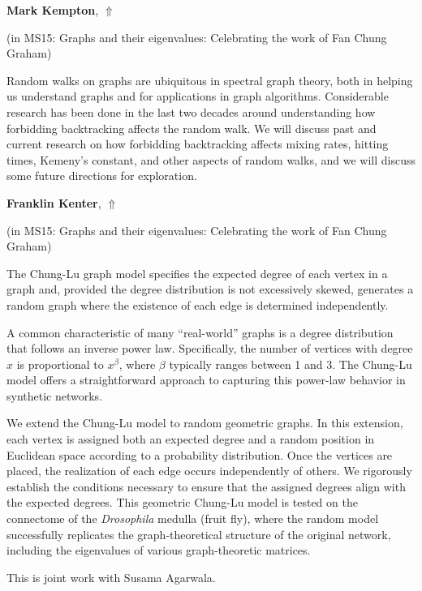 \documentclass[ILAS2025-program.tex]{subfiles}
\begin{document}
\hypertarget{down0140}{}\begin{ilasabstract}
    
\textbf{Mark Kempton},  \hfill \hyperlink{up0140}{$\Uparrow$}
    
    
(in {\color{mstitle}MS15: Graphs and their eigenvalues: Celebrating the work of Fan Chung Graham})
        
\mtskip
    Random walks on graphs are ubiquitous in spectral graph theory, both in helping us understand graphs and for applications in graph algorithms.  Considerable research has been done in the last two decades around understanding how forbidding backtracking affects the random walk.  We will discuss past and current research on how forbidding backtracking affects mixing rates, hitting times, Kemeny's constant, and other aspects of random walks, and we will discuss some future directions for exploration.

\end{ilasabstract}
    

\hypertarget{down0138}{}\begin{ilasabstract}
    
\textbf{Franklin Kenter},  \hfill \hyperlink{up0138}{$\Uparrow$}
    
    
(in {\color{mstitle}MS15: Graphs and their eigenvalues: Celebrating the work of Fan Chung Graham})
        
\mtskip
    The Chung-Lu graph model specifies the expected degree of each vertex in a graph and, provided the degree distribution is not excessively skewed, generates a random graph where the existence of each edge is determined independently.

A common characteristic of many ``real-world'' graphs is a degree distribution that follows an inverse power law. Specifically, the number of vertices with degree $x$ is proportional to $x^\beta$, where $\beta$ typically ranges between 1 and 3. The Chung-Lu model offers a straightforward approach to capturing this power-law behavior in synthetic networks.

We extend the Chung-Lu model to random geometric graphs. In this extension, each vertex is assigned both an expected degree and a random position in Euclidean space according to a probability distribution. Once the vertices are placed, the realization of each edge occurs independently of others. We rigorously establish the conditions necessary to ensure that the assigned degrees align with the expected degrees. This geometric Chung-Lu model is tested on the connectome of the \emph{Drosophila} medulla (fruit fly), where the random model successfully replicates the graph-theoretical structure of the original network, including the eigenvalues of various graph-theoretic matrices.

This is joint work with Susama Agarwala.

\end{ilasabstract}
    
\end{document}
